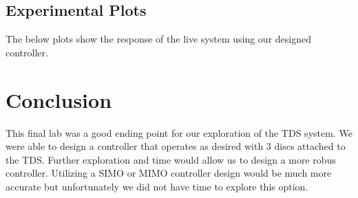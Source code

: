 \documentclass[11pt,titlepage]{article}
\begin{document}
    \subsection{Experimental Plots}
    The below plots show the response of the live system using our designed controller.

\section{Conclusion}
    This final lab was a good ending point for our exploration of the TDS system. We were able to design a controller that operates as desired with 3 discs attached to the TDS. Further exploration and time would allow us to design a more robus controller. Utilizing a SIMO or MIMO controller design would be much more accurate but unfortunately we did not have time to explore this option.
\end{document}
